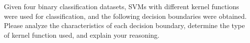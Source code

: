 \documentclass[12pt,letterpaper, onecolumn]{exam}
\begin{document}
\begin{questions}
    
    
    \begin{solution}
        \begin{parts}
            \part 

            \part 
           
        \end{parts}
    \end{solution}

    \question
    Given four binary classification datasets, SVMs with different kernel functions were used for classification, and the following decision boundaries were obtained. Please analyze the characteristics of each decision boundary, determine the type of kernel function used, and explain your reasoning.
    


    \begin{solution}
        \begin{parts}

\end{parts}
\end{solution}
\end{questions}
\end{document}
